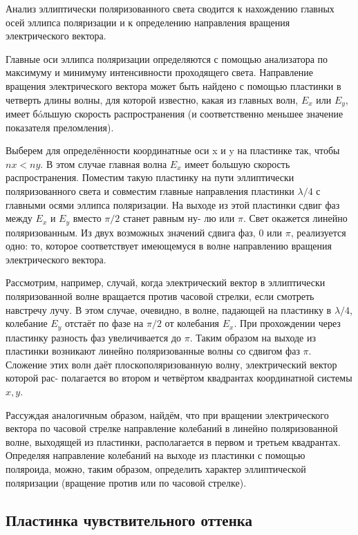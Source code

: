 \documentclass[a4paper, 12pt]{article}%
\begin{document}
Анализ эллиптически поляризованного света сводится к нахождению главных осей
эллипса поляризации и к определению направления вращения электрического вектора.

Главные оси эллипса поляризации определяются с помощью анализатора по максимуму и минимуму интенсивности проходящего света.
Направление вращения электрического вектора может быть найдено
с помощью пластинки в четверть длины волны, для которой известно,
какая из главных волн, $ E_x $ или $ E_y $, имеет б\'{o}льшую скорость распространения (и соответственно меньшее значение показателя преломления).

Выберем для определённости координатные оси x и y на пластинке
так, чтобы $ nx < ny $. В этом случае главная волна $ E_x $ имеет большую
скорость распространения. Поместим такую пластинку на пути эллиптически поляризованного света и совместим главные направления пластинки $ \lambda/4 $ с главными осями эллипса поляризации. На выходе из этой
пластинки сдвиг фаз между $ E_x $ и $ E_y $ вместо $ \pi/2 $ станет равным ну-
лю или $ \pi $. Свет окажется линейно поляризованным. Из двух возможных значений сдвига фаз, 0 или $ \pi $, реализуется одно: то, которое соответствует имеющемуся в волне направлению вращения электрического вектора.

Рассмотрим, например, случай, когда электрический вектор в эллиптически поляризованной волне вращается против часовой стрелки,
если смотреть навстречу лучу. В этом случае, очевидно, в волне, падающей на пластинку в $ \lambda/4 $, колебание $ E_y $ отстаёт по фазе на $ \pi/2 $ от
колебания $ E_x $. При прохождении через пластинку разность фаз увеличивается до $ \pi $. Таким образом на выходе из пластинки возникают линейно поляризованные волны со сдвигом фаз $ \pi $. Сложение этих волн
даёт плоскополяризованную волну, электрический вектор которой рас-
полагается во втором и четвёртом квадрантах координатной системы
$ x, y $.

Рассуждая аналогичным образом, найдём, что при вращении электрического вектора по часовой стрелке направление колебаний в линейно поляризованной волне, выходящей из пластинки, располагается в первом и третьем квадрантах. Определяя направление колебаний на выходе из пластинки с помощью поляроида, можно, таким образом, определить характер эллиптической поляризации (вращение против или по часовой стрелке).

\subsection{Пластинка чувствительного оттенка}
\end{document}

